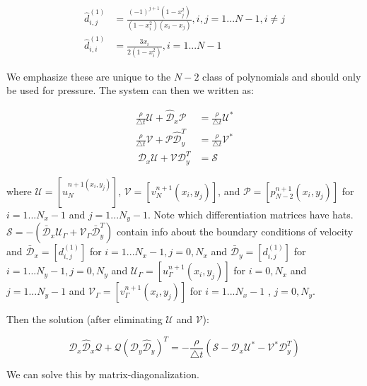\documentclass[12pt]{article}
\begin{document}
\begin{align*}
    \hat{d}_{i,j}^{(1)} &= \frac{(-1)^{j+1}(1-x_j^2)}{(1-x_i^2)(x_i - x_j)}, i, j =  1...N-1, i \neq j \\
    \hat{d}_{i,i}^{(1)} &= \frac{3x_i}{2(1-x_i^2)}, i=1...N-1
\end{align*}

We emphasize these are unique to the $N-2$ class of polynomials and should only be used for pressure. The system can then we written as:

\begin{align*}
    \frac{\rho}{\bigtriangleup t}\mathcal{U} + \hat{\mathcal{D}}_x \mathcal{P} &= \frac{\rho}{\bigtriangleup t}\mathcal{U}^* \\
    \frac{\rho}{\bigtriangleup t}\mathcal{V} +  \mathcal{P}\hat{\mathcal{D}}_y^T &= \frac{\rho}{\bigtriangleup t}\mathcal{V}^* \\\
    \mathcal{D}_x \mathcal{U} + \mathcal{V}\mathcal{D}_y^T &= \mathcal{S}
\end{align*}

where $\mathcal{U} = [u_N^{n+1(x_i,y_j)}]$, $\mathcal{V} = [v_N^{n+1}(x_i, y_j)]$, and $\mathcal{P} = [p_{N-2}^{n+1}(x_i, y_j)]$ for $i = 1...N_x-1$ and $j=1...N_y-1$. Note which differentiation matrices have hats. $\mathcal{S} = -(\bar{\mathcal{D}}_x \mathcal{U}_{\Gamma} + \mathcal{V}_\Gamma \bar{\mathcal{D}}_y^T)$ contain info about the boundary conditions of velocity and $\bar{\mathcal{D}}_x = [d_{i,j}^{(1)}]$ for $i = 1...N_x-1, j=0,N_x$ and $\bar{\mathcal{D}}_y = [d_{i,j}^{(1)}]$ for $i = 1...N_y-1, j=0,N_y$ and $\mathcal{U}_\Gamma = [u^{n+1}_\Gamma(x_i, y_j)]$ for $i=0,N_x$ and $j = 1...N_y-1$ and $\mathcal{V}_\Gamma = [v^{n+1}_\Gamma(x_i, y_j)]$ for $i=1...N_x-1$ , $j=0,N_y$.

Then the solution (after eliminating $\mathcal{U}$ and $\mathcal{V}$):

\begin{equation}
    \mathcal{D}_x\hat{\mathcal{D}}_x\mathcal{Q} + \mathcal{Q}(\mathcal{D}_y\hat{\mathcal{D}}_y)^T = -\frac{\rho}{\bigtriangleup t}(\mathcal{S} - \mathcal{D}_x \mathcal{U}^* - \mathcal{V}^*\mathcal{D}_y^T)
\end{equation}

We can solve this by matrix-diagonalization.
\end{document}

